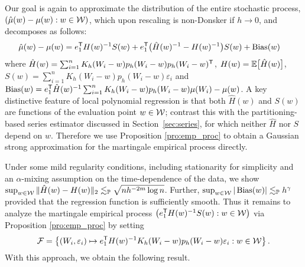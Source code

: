 Our goal is again to approximate the distribution of the entire stochastic
process, $(\hat{\mu}(w)-\mu(w):w\in\mathcal{W})$, which upon rescaling is non-Donsker
if $h \to 0$, and decomposes as follows:
%
\begin{align*}
  \hat{\mu}(w)-\mu(w)
  &= e_1^{\mathsf{T}} H(w)^{-1} S(w)
  + e_1^{\mathsf{T}} \big(\hat H(w)^{-1} - H(w)^{-1}\big) S(w)
  + \operatorname{Bias}(w)
\end{align*}
%
where
$\hat H(w) = \sum_{i=1}^n K_h(W_i-w) p_h(W_i-w) p_h(W_i-w)^{\mathsf{T}}$,
$H(w) = \mathbb{E} \big[ \hat H(w) \big]$,
$S(w)= \sum_{i=1}^n K_h(W_i-w) p_h(W_i-w) \varepsilon_i$
and
$\operatorname{Bias}(w) = e_1^{\mathsf{T}} \hat H(w)^{-1}
\sum_{i=1}^n K_h(W_i-w) p_h(W_i-w) \mu(W_i) - \mu(w)$.
A key distinctive feature of local polynomial regression is that both
$\hat H(w)$ and $S(w)$ are functions of the evaluation point $w\in\mathcal{W}$;
contrast this with the partitioning-based series estimator discussed in
Section~\ref{sec:series}, for which neither $\hat H$ nor $S$ depend on $w$.
Therefore we use Proposition \ref{pro:emp_proc} to obtain a Gaussian strong
approximation for the martingale empirical process directly.

Under some mild regularity conditions, including stationarity for simplicity
and an $\alpha$-mixing assumption on the time-dependence of the data, we show
$\sup_{w\in\mathcal{W}} \|\hat H(w)-H(w)\|_2
\lesssim_{\mathbb{P}} \sqrt{n h^{-2m}\log n}$.
Further,
$\sup_{w\in\mathcal{W}} |\operatorname{Bias}(w)|
\lesssim_{\mathbb{P}} h^\gamma$
provided that the regression function is sufficiently smooth.
Thus it remains to analyze the martingale empirical process
$\big(e_1^{\mathsf{T}} H(w)^{-1} S(w) : w\in\mathcal{W}\big)$
via Proposition \ref{pro:emp_proc} by setting
%
\begin{align*}
  \mathcal{F} = \left\{
  (W_i, \varepsilon_i) \mapsto
  e_1^{\mathsf{T}} H(w)^{-1}
  K_h(W_i-w) p_h(W_i-w) \varepsilon_i
  : w \in \mathcal{W}
  \right\}.
\end{align*}
%
With this approach, we obtain the following result.

